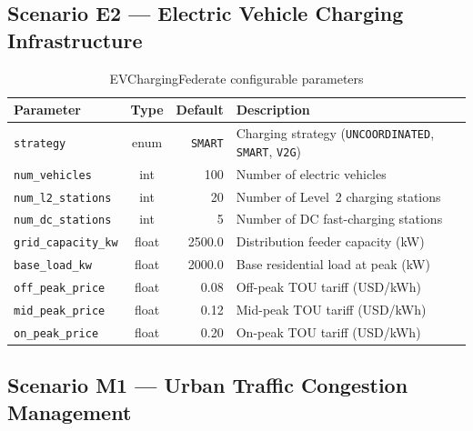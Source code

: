 \subsection*{Scenario E2 --- Electric Vehicle Charging Infrastructure}

\begin{table}[h]
    \centering
    \caption{EVChargingFederate configurable parameters}
    \label{tab:params-e2}
    \small
    \begin{tabular}{|l|c|r|p{6cm}|}
        \hline
        \textbf{Parameter} & \textbf{Type} & \textbf{Default} & \textbf{Description} \\
        \hline
        \texttt{strategy}           & enum  & \texttt{SMART}  & Charging strategy (\texttt{UNCOORDINATED}, \texttt{SMART}, \texttt{V2G}) \\
        \hline
        \texttt{num\_vehicles}      & int   & 100    & Number of electric vehicles \\
        \hline
        \texttt{num\_l2\_stations}  & int   & 20     & Number of Level~2 charging stations \\
        \hline
        \texttt{num\_dc\_stations}  & int   & 5      & Number of DC fast-charging stations \\
        \hline
        \texttt{grid\_capacity\_kw} & float & 2500.0 & Distribution feeder capacity (kW) \\
        \hline
        \texttt{base\_load\_kw}     & float & 2000.0 & Base residential load at peak (kW) \\
        \hline
        \texttt{off\_peak\_price}   & float & 0.08   & Off-peak TOU tariff (USD/kWh) \\
        \hline
        \texttt{mid\_peak\_price}   & float & 0.12   & Mid-peak TOU tariff (USD/kWh) \\
        \hline
        \texttt{on\_peak\_price}    & float & 0.20   & On-peak TOU tariff (USD/kWh) \\
        \hline
    \end{tabular}
\end{table}

\subsection*{Scenario M1 --- Urban Traffic Congestion Management}

